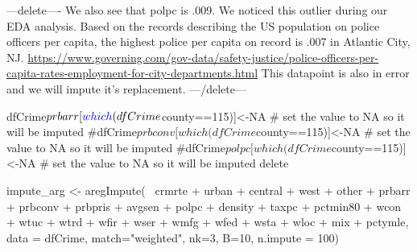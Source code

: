 \documentclass[]{article}
\newenvironment{Shaded}{}{}
\newcommand{\CommentTok}[1]{\textcolor[rgb]{0.00,0.50,0.00}{#1}}
\newcommand{\DataTypeTok}[1]{#1}
\newcommand{\DecValTok}[1]{#1}
\newcommand{\KeywordTok}[1]{\textcolor[rgb]{0.00,0.00,1.00}{#1}}
\newcommand{\NormalTok}[1]{#1}
\newcommand{\OperatorTok}[1]{#1}
\newcommand{\OtherTok}[1]{\textcolor[rgb]{1.00,0.25,0.00}{#1}}
\newcommand{\StringTok}[1]{\textcolor[rgb]{0.00,0.50,0.50}{#1}}
\begin{document}
---delete---- We also see that polpc is .009. We noticed this outlier
during our EDA analysis. Based on the records describing the US
population on police officers per capita, the highest police per capita
on record is .007 in Atlantic City, NJ.
\url{https://www.governing.com/gov-data/safety-justice/police-officers-per-capita-rates-employment-for-city-departments.html}
This datapoint is also in error and we will impute it's replacement.
---/delete---

\begin{Shaded}
\begin{Highlighting}[]
\NormalTok{dfCrime}\OperatorTok{$}\NormalTok{prbarr[}\KeywordTok{which}\NormalTok{(dfCrime}\OperatorTok{$}\NormalTok{county}\OperatorTok{==}\DecValTok{115}\NormalTok{)]<-}\OtherTok{NA} \CommentTok{# set the value to NA so it will be imputed}
\CommentTok{#dfCrime$prbconv[which(dfCrime$county==115)]<-NA # set the value to NA so it will be imputed}
\CommentTok{#dfCrime$polpc[which(dfCrime$county==115)]<-NA # set the value to NA so it will be imputed delete}
\end{Highlighting}
\end{Shaded}

\begin{Shaded}
\begin{Highlighting}[]
\NormalTok{impute_arg <-}\StringTok{ }\KeywordTok{aregImpute}\NormalTok{(}\OperatorTok{~}\StringTok{ }\NormalTok{crmrte }\OperatorTok{+}\StringTok{  }\NormalTok{urban }\OperatorTok{+}\StringTok{ }\NormalTok{central }\OperatorTok{+}\StringTok{ }\NormalTok{west }\OperatorTok{+}\StringTok{ }\NormalTok{other }\OperatorTok{+}
\StringTok{                         }\NormalTok{prbarr }\OperatorTok{+}\StringTok{ }\NormalTok{prbconv }\OperatorTok{+}\StringTok{ }\NormalTok{prbpris }\OperatorTok{+}\StringTok{ }\NormalTok{avgsen }\OperatorTok{+}\StringTok{ }\NormalTok{polpc }\OperatorTok{+}\StringTok{ }
\StringTok{                         }\NormalTok{density }\OperatorTok{+}\StringTok{ }\NormalTok{taxpc }\OperatorTok{+}\StringTok{ }\NormalTok{pctmin80 }\OperatorTok{+}\StringTok{ }\NormalTok{wcon }\OperatorTok{+}\StringTok{ }\NormalTok{wtuc }\OperatorTok{+}
\StringTok{                         }\NormalTok{wtrd }\OperatorTok{+}\StringTok{ }\NormalTok{wfir }\OperatorTok{+}\StringTok{ }\NormalTok{wser }\OperatorTok{+}\StringTok{ }\NormalTok{wmfg }\OperatorTok{+}\StringTok{ }\NormalTok{wfed }\OperatorTok{+}\StringTok{ }\NormalTok{wsta }\OperatorTok{+}\StringTok{ }\NormalTok{wloc }\OperatorTok{+}
\StringTok{                         }\NormalTok{mix }\OperatorTok{+}\StringTok{ }\NormalTok{pctymle, }\DataTypeTok{data =}\NormalTok{ dfCrime, }\DataTypeTok{match=}\StringTok{"weighted"}\NormalTok{,}
                         \DataTypeTok{nk=}\DecValTok{3}\NormalTok{, }\DataTypeTok{B=}\DecValTok{10}\NormalTok{, }\DataTypeTok{n.impute =} \DecValTok{100}\NormalTok{)}
\end{Highlighting}
\end{Shaded}
\end{document}
